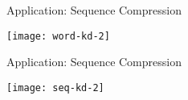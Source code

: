 \begin{frame}{Application: Sequence Compression }
  \begin{center}
    \texttt{[image: word-kd-2]}
  \end{center}
\end{frame}

\begin{frame}{Application: Sequence Compression }
  \begin{center}
    \texttt{[image: seq-kd-2]}
  \end{center}
\end{frame}








